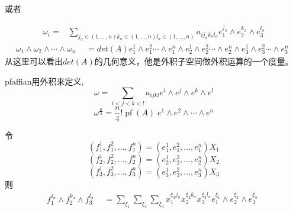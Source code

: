 \documentclass[twoside,a4paper,CCT]{cctart}   %
\begin{document}
或者

\begin{equation}
\begin{aligned}
\omega_{i}=
& \sum_{j_{\sigma}\in {(1,...,n)}k_{\sigma}\in {(1,...,n)}l_{\sigma}\in{(1,...,n)}}a_{ij_{\sigma}k_{\sigma}l_{\sigma}} e_{1}^{j_{\sigma}} \wedge e_{2}^{k_{\sigma}} \wedge e_{3}^{l_{\sigma}}
\end{aligned}\end{equation}
\begin{equation}
\omega_{1}\wedge\omega_{2}\wedge\cdots\wedge\omega_{n}
\begin{aligned}
& = det(A) e_{1}^1\wedge e_{1}^2 \cdots \wedge e_{1}^n \wedge e_{2}^1\wedge e_{2}^2 \cdots \wedge e_{2}^n
\wedge e_{3}^1\wedge e_{3}^2 \cdots \wedge e_{3}^n
\end{aligned}
\end{equation}
从这里可以看出$det(A)$的几何意义，他是外积子空间做外积运算的一个度量。

pfaffian用外积来定义,
\begin{equation}\omega=\sum_{i<j<k<l}a_{ijkl}e^{i} \wedge e^{j} \wedge e^{k} \wedge e^{l}\end{equation}
\begin{equation}\omega^{\frac{n}{4}} = \frac{n}{4}! \operatorname{pf}(A)\;e^1\wedge e^2\wedge\cdots\wedge e^{n}\end{equation}

令
$$(f_{1}^{1},f_{1}^{2},...,f_{1}^{n})=(e_{1}^{1},e_{1}^{2},...,e_{1}^{n})X_{1}$$
$$(f_{2}^{1},f_{2}^{2},...,f_{2}^{n})=(e_{2}^{1},e_{2}^{2},...,e_{2}^{n})X_{2}$$
$$(f_{3}^{1},f_{3}^{2},...,f_{3}^{n})=(e_{3}^{1},e_{3}^{2},...,e_{3}^{n})X_{3}$$
则
\begin{equation}
f_{1}^{j_{\sigma}}\wedge f_{2}^{k_{\sigma}}\wedge f_{3}^{l_{\sigma}}
\begin{aligned}
& = \sum_{\xi_{1}}\sum_{\xi_{2}}\sum_{\xi_{3}}x_{1}^{\xi_{1}j_{\sigma}}x_{2}^{\xi_{2}k_{\sigma}}x_{3}^{\xi_{
3}l_{\sigma}}e_{1}^{\xi_{1}}\wedge e_{2}^{\xi_{2}}\wedge e_{3}^{\xi_{3}}
\end{aligned}
\end{equation}
\end{document}
